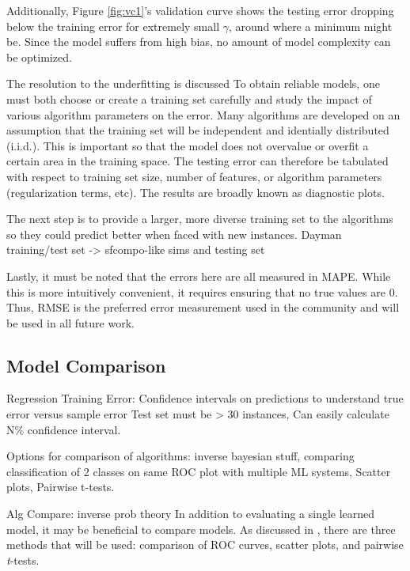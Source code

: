 Additionally, Figure \ref{fig:vc1}'s validation curve shows the testing error
dropping below the training error for extremely small $\gamma$, around where a
minimum might be.  Since the model suffers from high bias, no amount of model
complexity can be optimized. 

The resolution to the underfitting is discussed
To obtain reliable models, one must both choose or create a training set
carefully and study the impact of various algorithm parameters on the error.
Many algorithms are developed on an assumption that the training set will be
independent and identially distributed (i.i.d.). This is important so that the
model does not overvalue or overfit a certain area in the training space. The
testing error can therefore be tabulated with respect to training set size,
number of features, or algorithm parameters (regularization terms, etc). The
results are broadly known as diagnostic plots. 

The next step is to provide a larger, more diverse training set to the
algorithms so they could predict better when faced with new instances.  Dayman
training/test set -> sfcompo-like sims and testing set

Lastly, it must be noted that the errors here are all measured in \gls{MAPE}.
While this is more intuitively convenient, it requires ensuring that no true
values are $0$. Thus, \gls{RMSE} is the preferred error measurement used in
the community and will be used in all future work.

\subsection{Model Comparison}
\label{sec:algcompare}

Regression Training Error: Confidence intervals on predictions to understand
true error versus sample error Test set must be > 30 instances, Can easily
calculate N\% confidence interval.

Options for comparison of algorithms: inverse bayesian stuff, comparing
classification of 2 classes on same ROC plot with multiple ML systems, Scatter
plots, Pairwise t-tests.

Alg Compare: inverse prob theory
In addition to evaluating a single learned model, it may be beneficial to
compare models. As discussed in , there
are three methods that will be used: comparison of \gls{ROC} curves, scatter
plots, and pairwise \textit{t}-tests.

